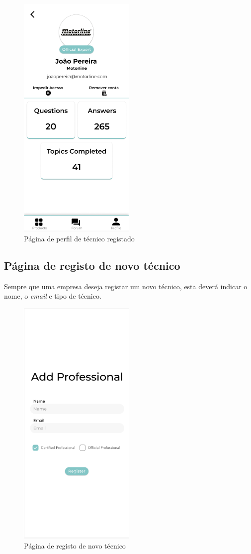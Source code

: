 \begin{figure}[htb]
    \centering
    \includegraphics[width=0.5\textwidth]{images/mockups/professional_profile.png}
    \caption{Página de perfil de técnico registado}
    \label{fig:32}
\end{figure}

\newpage

\subsection{Página de registo de novo técnico}

Sempre que uma empresa deseja registar um novo técnico, esta deverá indicar o nome, o \textit{email} e tipo de técnico.

\begin{figure}[htb]
    \centering
    \includegraphics[width=0.5\textwidth]{images/mockups/account_registering.png}
    \caption{Página de registo de novo técnico}
    \label{fig:33}
\end{figure}